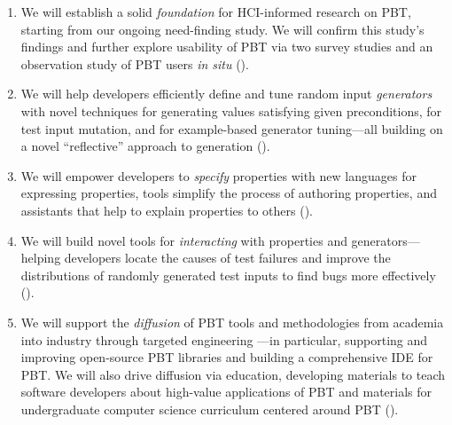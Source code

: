 \begin{enumerate}[noitemsep]
\item We will establish a solid \emph{foundation} for HCI-informed research on PBT,
starting from our ongoing need-finding study. We will confirm
this study's findings and further explore usability of PBT via
two survey studies and an observation study
of PBT users {\em in situ} ().
%
\item We will help developers efficiently define and tune random input
\emph{generators} with novel techniques for generating values
satisfying given preconditions, for test input mutation, and for
example-based generator tuning---all building on a novel
``reflective'' approach to generation ().
%
\item We will empower developers to \emph{specify} properties with new
languages for expressing properties, tools simplify the process of authoring
properties, and assistants that help to explain properties to others
().
%
\item We will build novel tools for {\em interacting} with properties
and generators---helping developers locate the causes of test
failures and improve the distributions of randomly
generated test inputs to find bugs more effectively ().
%
\item We will support the {\em diffusion} of PBT tools and
methodologies from academia into industry through targeted engineering
---in particular, supporting and
improving open-source PBT libraries and building a comprehensive IDE for PBT.
We will also drive diffusion via education, developing materials to teach
software developers about high-value applications of PBT and materials for
undergraduate computer science curriculum centered around
PBT
().  \iflater{}\fi
\end{enumerate}
